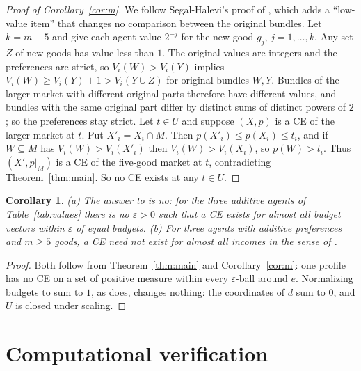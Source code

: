 \documentclass[11pt]{article}
\newtheorem{corollary}[theorem]{Corollary}
\theoremstyle{definition}
\theoremstyle{remark}
\begin{document}
\begin{proof}[Proof of Corollary~\ref{cor:m}]
We follow Segal-Halevi's proof of \cite[Lemma~5(a)]{SH}, which adds a
``low-value item'' that changes no comparison between the original
bundles. Let $k=m-5$ and give each agent value $2^{-j}$ for the new good
$g_j$, $j=1,\dots,k$. Any set $Z$ of new goods has value less than $1$.
The original values are integers and the preferences are strict, so
$V_i(W)>V_i(Y)$ implies $V_i(W)\ge V_i(Y)+1>V_i(Y\cup Z)$ for original
bundles $W,Y$. Bundles of the larger market with different original parts
therefore have different values, and bundles with the same original part
differ by distinct sums of distinct powers of $2$; so the preferences stay
strict. Let $t\in U$ and suppose $(X,p)$ is a CE of the larger market at
$t$. Put $X'_i=X_i\cap M$. Then $p(X'_i)\le p(X_i)\le t_i$, and if
$W\subseteq M$ has $V_i(W)>V_i(X'_i)$ then $V_i(W)>V_i(X_i)$, so
$p(W)>t_i$. Thus $(X',p|_M)$ is a CE of the five-good market at $t$,
contradicting Theorem~\ref{thm:main}. So no CE exists at any $t\in U$.
\end{proof}

\begin{corollary}\label{cor:questions}
(a) The answer to \cite[Open Problem~1]{BNT} is no: for the three additive
agents of Table~\ref{tab:values} there is no $\varepsilon>0$ such that a CE
exists for almost all budget vectors within $\varepsilon$ of equal budgets.
(b) For three agents with additive preferences and $m\ge5$ goods, a CE
need not exist for almost all incomes in the sense of
\cite[Definition~3]{SH}.
\end{corollary}

\begin{proof}
Both follow from Theorem~\ref{thm:main} and Corollary~\ref{cor:m}: one
profile has no CE on a set of positive measure within every
$\varepsilon$-ball around $e$. Normalizing budgets to sum to $1$, as
\cite[Section~2.1]{BNT} does, changes nothing: the coordinates of $d$ sum
to $0$, and $U$ is closed under scaling.
\end{proof}

\section{Computational verification}\label{sec:verification}
\end{document}
